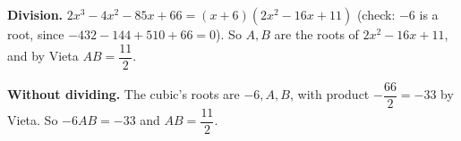 \textbf{Division.} $2x^3-4x^2-85x+66=(x+6)(2x^2-16x+11)$ (check: $-6$ is a root, since $-432-144+510+66=0$). So $A,B$ are the roots of $2x^2-16x+11$, and by Vieta $AB=\boxed{\dfrac{11}{2}}$.

\textbf{Without dividing.} The cubic's roots are $-6,A,B$, with product $-\dfrac{66}{2}=-33$ by Vieta. So $-6AB=-33$ and $AB=\dfrac{11}{2}$.
